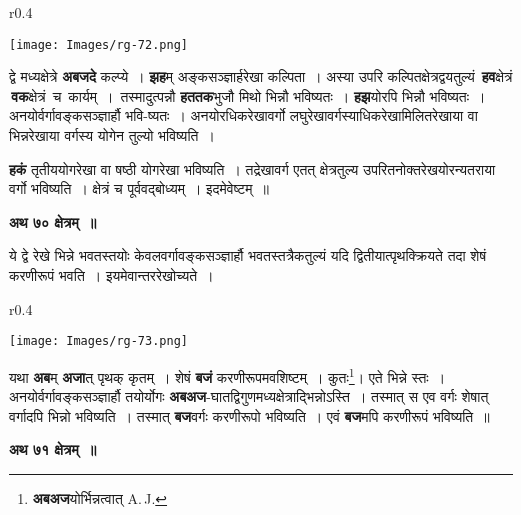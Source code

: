 \documentclass[11pt, openany]{book}
\begin{document}
\begin{wrapfigure}{r}{0.4\textwidth}
\vspace{-12mm}
\begin{center}
\texttt{[image: Images/rg-72.png]}
\end{center}
\vspace{-8mm}
\end{wrapfigure}

द्वे मध्यक्षेत्रे \textbf{अबजदे} कल्प्ये~। \textbf{झह}म् अङ्कसञ्ज्ञार्हरेखा कल्पिता~। अस्या उपरि कल्पितक्षेत्रद्वयतुल्यं \,\textbf{हव}क्षेत्रं \,\textbf{वक}क्षेत्रं \,च \,कार्यम्~। \,तस्मादुत्पन्नौ \textbf{हततक}भुजौ मिथो भिन्नौ भविष्यतः~। \textbf{हझ}योरपि भिन्नौ भविष्यतः~। अनयोर्वर्गावङ्कसञ्ज्ञार्हौ भवि-ष्यतः~। अनयोरधिकरेखावर्गो लघुरेखावर्गस्याधिकरेखामिलितरेखाया वा भिन्नरेखाया वर्गस्य योगेन तुल्यो भविष्यति~।

\newpage
\noindent \textbf{हकं} तृतीययोगरेखा वा षष्ठी योगरेखा भविष्यति~। तद्रेखावर्ग एतत् क्षेत्रतुल्य उपरितनोक्तरेखयोरन्यतराया वर्गो भविष्यति~। क्षेत्रं च पूर्ववद्बोध्यम्~। इदमेवेष्टम्~॥
\vspace{2mm}

\begin{center}
\textbf{\large  अथ ७० क्षेत्रम्~॥}
\end{center}

{\ab ये द्वे रेखे भिन्ने भवतस्तयोः केवलवर्गावङ्कसञ्ज्ञार्हौ भवतस्तत्रैकतुल्यं यदि द्वितीयात्पृथक्क्रियते तदा शेषं करणीरूपं भवति~। इयमेवान्तररेखोच्यते~।}\\

\begin{wrapfigure}{r}{0.4\textwidth}
\vspace{-7mm}
\begin{flushright}
\texttt{[image: Images/rg-73.png]}
\end{flushright}
\vspace{-8mm}
\end{wrapfigure}

यथा \textbf{अब}म् \textbf{अजा}त् पृथक् कृतम्~। शेषं \textbf{बजं} करणीरूपमवशिष्टम्~। कुतः\renewcommand{\thefootnote}{१}\footnote{\textbf{अबअज}योर्भिन्नत्वात् {\en A.\,J.}}\;। एते भिन्ने स्तः~। अनयोर्वर्गावङ्कसञ्ज्ञार्हौ तयोर्योगः \textbf{अबअज}-घातद्विगुणमध्यक्षेत्राद्भिन्नोऽस्ति~। तस्मात् स एव वर्गः शेषात् वर्गादपि भिन्नो भविष्यति~। तस्मात् \textbf{बज}वर्गः करणीरूपो भविष्यति~। एवं \textbf{बज}मपि करणीरूपं भविष्यति~॥
\vspace{2mm}

\begin{center}
\textbf{\large  अथ ७१ क्षेत्रम्~॥}
\end{center}
\end{document}
